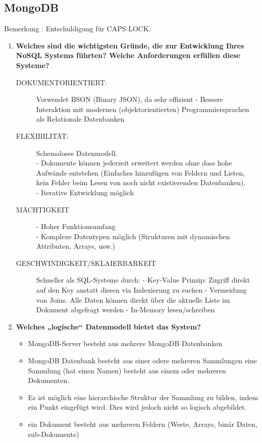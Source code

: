 \documentclass[a4paper,10pt,titlepage=false]{scrreprt}
\begin{document}
\begin{itemize}
\section{MongoDB} %
Bemerkung : Entschuldigung für CAPS LOCK.
\label{sec:mongodb}
\begin{enumerate}
  \item \textbf{Welches sind die wichtigsten Gründe, die zur Entwicklung Ihres NoSQL Systems führten? Welche Anforderungen erfüllen diese Systeme?}\\
  \begin{description}
    \item[DOKUMENTORIENTIERT:] Verwendet BSON (Binary JSON), da sehr effizient
   - Bessere Interaktion mit modernen (objektorientierten) Programmiersprachen als Relationale Datenbanken
   \item[FLEXIBILITÄT:]  Schemaloses Datenmodell.\\
   - Dokumente können jederzeit erweitert werden ohne dass hohe Aufwände entstehen (Einfaches hinzufügen von Feldern und Listen, kein Fehler beim Lesen von noch nicht existierenden Datenbanken).\\
   - Iterative Entwicklung möglich \\
   \item[MÄCHTIGKEIT] - Hoher Funktionsumfang\\
   - Komplexe Datentypen möglich (Strukturen mit dynamischen Attributen, Arrays, usw.)
   \item[GESCHWINDIGKEIT/SKLAIERBARKEIT]    Schneller als SQL-Systeme durch:
   - Key-Value Prinzip: Zugriff direkt auf den Key anstatt diesen via Indexierung zu suchen
   - Vermeidung von Joins. Alle Daten können direkt über die aktuelle Liste im Dokument abgefragt werden
   - In-Memory lesen/schreiben
  \end{description}
  \item \textbf{Welches „logische“ Datenmodell bietet das System?} \hfill  \\
  \begin{itemize}
    \item MongoDB-Server besteht  aus mehrere MongoDB Datenbanken
\item MongoDB Datenbank besteht aus einer odere mehreren Sammlungen
eine Sammlung (hat einen Namen) besteht aus einem oder mehreren Dokumenten.
\item Es ist möglich eine hierarchische Struktur der Sammlung zu bilden, indem ein Punkt eingefügt wird. Dies wird jedoch nicht so logisch abgebildet.
\item ein Dokument besteht aus mehreren Feldern (Werte, Arrays, binär Daten, sub-Dokumente)

\end{itemize}
\end{enumerate}
\end{itemize}
\end{document}
